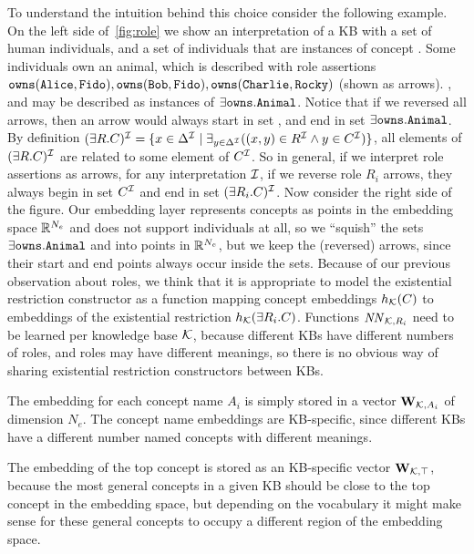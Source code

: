 To understand the intuition behind this choice consider the following example.
On the left side of~\autoref{fig:role} we show an interpretation of a KB with a set of human individuals, and a set of individuals that are instances of concept .
Some individuals own an animal, which is described with role assertions $\texttt{owns}(\texttt{Alice}, \texttt{Fido}), \texttt{owns}(\texttt{Bob}, \texttt{Fido}), \texttt{owns}(\texttt{Charlie}, \texttt{Rocky})$ (shown as arrows).
,  and  may be described as instances of $\exists \texttt{owns} . \texttt{Animal}$.
Notice that if we reversed all  arrows, then an  arrow would always start in set , and end in set $\exists \texttt{owns} . \texttt{Animal}$.
By definition $(\exists R . C)^{\mathcal{I}} = \{ x \in \Delta^\mathcal{I} \mid \exists_{y \in \Delta^\mathcal{I}} ( (x, y) \in R^{\mathcal{I}} \land y \in C^{\mathcal{I}} ) \}$, all elements of $(\exists R . C)^{\mathcal{I}}$ are related to some element of $C^{\mathcal{I}}$.
So in general, if we interpret role assertions as arrows, for any interpretation $\mathcal{I}$, if we reverse role $R_i$ arrows, they always begin in set $C^{\mathcal{I}}$ and end in set $(\exists R_i . C)^{\mathcal{I}}$.
Now consider the right side of the figure.
Our embedding layer represents concepts as points in the embedding space $\mathbb{R}^{N_e}$ and does not support individuals at all, so we ``squish'' the sets $\exists \texttt{owns} . \texttt{Animal}$ and  into points in $\mathbb{R}^{N_e}$, but we keep the (reversed) arrows, since their start and end points always occur inside the sets.
Because of our previous observation about roles, we think that it is appropriate to model the existential restriction constructor as a function mapping concept embeddings $h_{\mathcal{K}}(C)$ to embeddings of the existential restriction $h_{\mathcal{K}}(\exists R_i . C)$.
Functions $\mathit{NN}_{\mathcal{K},R_i}$ need to be learned per knowledge base $\mathcal{K}$, because different KBs have different numbers of roles, and roles may have different meanings, so there is no obvious way of sharing existential restriction constructors between KBs.

The embedding for each concept name $A_i$ is simply stored in a vector $\mathbf{W}_{\mathcal{K},A_i}$ of dimension $N_e$. The concept name embeddings are KB-specific, since different KBs have a different number named concepts with different meanings.

The embedding of the top concept is stored as an KB-specific vector $\mathbf{W}_{\mathcal{K},\top}$, because the most general concepts in a given KB should be close to the top concept in the embedding space, but depending on the vocabulary it might make sense for these general concepts to occupy a different region of the embedding space.

